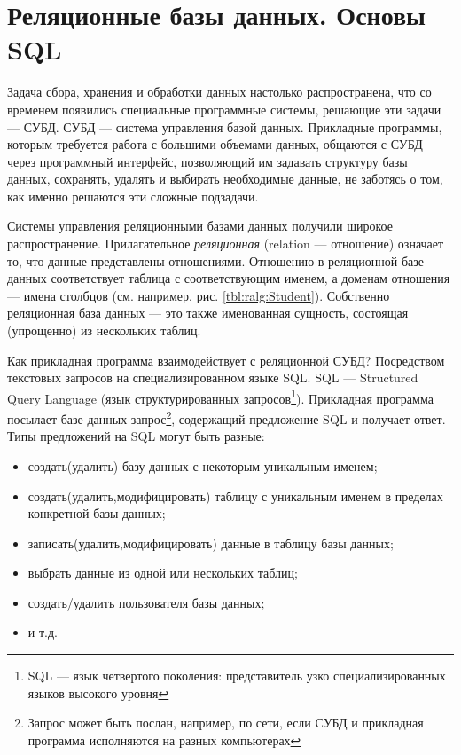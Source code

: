 \section{Реляционные базы данных. Основы SQL}

Задача сбора, хранения и обработки данных настолько распространена, что со временем появились специальные программные системы, решающие эти задачи --- СУБД. СУБД --- система управления базой данных. Прикладные программы, которым требуется работа с большими объемами данных, общаются с СУБД через программный интерфейс, позволяющий им задавать структуру базы данных, сохранять, удалять и выбирать необходимые данные, не заботясь о том, как именно решаются эти сложные подзадачи. 

Системы управления реляционными базами данных получили широкое распространение. Прилагательное \emph{реляционная} (relation --- отношение) означает то, что данные представлены отношениями. Отношению в реляционной базе данных соответствует таблица с соответствующим именем, а доменам отношения --- имена столбцов (см. например, рис. \ref{tbl:ralg:Student}). Собственно реляционная база данных --- это также именованная сущность, состоящая (упрощенно) из нескольких таблиц.

Как прикладная программа взаимодействует с реляционной СУБД? Посредством текстовых запросов на специализированном языке SQL. SQL --- Structured Query Language (язык структурированных запросов\footnote{SQL --- язык четвертого поколения: представитель узко специализированных языков высокого уровня}). Прикладная программа посылает базе данных запрос\footnote{Запрос может быть послан, например, по сети, если СУБД и прикладная программа исполняются на разных компьютерах}, содержащий предложение SQL и получает ответ. Типы предложений на SQL могут быть разные: 
\begin{itemize}
    \item создать(удалить) базу данных с некоторым уникальным именем;
    \item создать(удалить,модифицировать) таблицу с уникальным именем в пределах конкретной базы данных;
    \item записать(удалить,модифицировать) данные в таблицу базы данных;
    \item выбрать данные из одной или нескольких таблиц;
    \item создать/удалить пользователя базы данных;
    \item и т.д.
\end{itemize}

